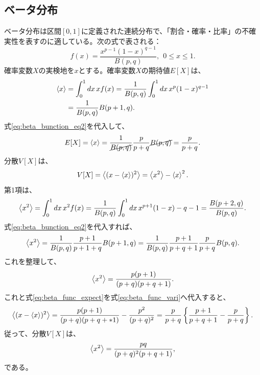 \subsection{ベータ分布}
ベータ分布は区間$[0,1]$に定義された連続分布で、「割合・確率・比率」の不確実性を表すのに適している。次の式で表される：
\begin{equation}
 f(x)=\dfrac{x^{p-1}(1-x)^{q-1}}{B(p,q)},\ \ 0\le x\le 1.
\end{equation}
確率変数$X$の実検地を$x$とする。確率変数$X$の期待値$E[X]$は、
\begin{align*}
 \ev{x}&=\int_0^1dx\,xf(x)=\dfrac{1}{B(p,q)}\int_0^1dx\,x^p(1-x)^{q-1}\\
&=\dfrac{1}{B(p,q)}B(p+1,q).
\end{align*}
式\eqref{eq:beta_bunction_eq2}を代入して、
\begin{equation}
 E[X]=\ev{x}=\dfrac{1}{\cancel{B(p,q)}}\dfrac{p}{p+q}\cancel{B(p,q)}=\dfrac{p}{p+q}.\label{eq:beta_func_expect}
\end{equation}
分散$V[X]$は、
\begin{equation}
 V[X]=\ev{(x-\ev{x})^2}=\ev{x^2}-\ev{x}^2.\label{eq:beta_func_vari}
\end{equation}
第1項は、
\begin{equation}
 \ev{x^2}=\int_0^1dx\,x^2f(x)=\dfrac{1}{B(p,q)}\int_0^1dx\,x^{p+1}(1-x)-{q-1}=\dfrac{B(p+2,q)}{B(p,q)}.
\end{equation}
式\eqref{eq:beta_bunction_eq2}を代入すれば、
\begin{equation*}
 \ev{x^2}=\dfrac{1}{B(p,q)}\dfrac{p+1}{p+1+q}B(p+1,q)=\dfrac{1}{B(p,q)}\dfrac{p+1}{p+q+1}\dfrac{p}{p+q}B(p,q).\\
\end{equation*}
これを整理して、
\begin{equation}
 \ev{x^2}=\dfrac{p(p+1)}{(p+q)(p+q+1)}.
\end{equation}
これと式\eqref{eq:beta_func_expect}を式\eqref{eq:beta_func_vari}へ代入すると、
\begin{equation}
 \ev{(x-\ev{x})^2}=\dfrac{p(p+1)}{(p+q)(p+q+*1)}-\dfrac{p^2}{(p+q)^2}=\dfrac{p}{p+q}\left\{\dfrac{p+1}{p+q+1}-\dfrac{p}{p+q}\right\}.
\end{equation}
従って、分散$V[X]$は、
\begin{equation}
 \ev{x^2}=\dfrac{pq}{(p+q)^2{(p+q+1)}},
\end{equation}
である。
